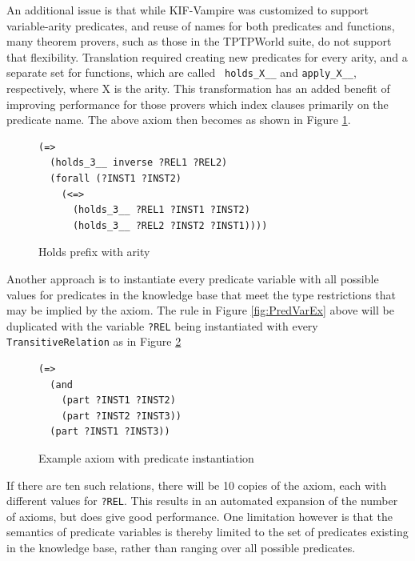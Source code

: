\documentclass{book}
\begin{document}
An additional issue is that while KIF-Vampire was customized to support
variable-arity predicates, and reuse of names for both predicates and functions,
many theorem provers, such as those in the TPTPWorld suite, do not support that
flexibility.  Translation required creating new predicates for every
arity, and a separate set for functions, which are called {\tt
holds\_X\_\_} and {\tt apply\_X\_\_}, respectively, where X is the arity.  This
transformation has an added benefit of improving performance for those provers
which index clauses primarily on the predicate name.  The above axiom then
becomes as shown in Figure \ref{fig:HoldsArity}.

\begin{figure}
\begin{framed}
\label{fig:HoldsArity}
\begin{verbatim}
(=>
  (holds_3__ inverse ?REL1 ?REL2)
  (forall (?INST1 ?INST2)
    (<=>
      (holds_3__ ?REL1 ?INST1 ?INST2)
      (holds_3__ ?REL2 ?INST2 ?INST1))))
\end{verbatim}
\caption{Holds prefix with arity}
\end{framed}
\end{figure}

Another approach is to instantiate every predicate variable with all possible
values for predicates in the knowledge base that meet the type restrictions that
may be implied by the axiom.  The rule in Figure \ref{fig:PredVarEx} above will
be duplicated with the variable {\tt ?REL} being instantiated with every {\tt
TransitiveRelation} as in Figure \ref{fig:ExAxPred}
 
\begin{figure}
\begin{framed}
\label{fig:ExAxPred}
\begin{verbatim}
(=>
  (and
    (part ?INST1 ?INST2)
    (part ?INST2 ?INST3))
  (part ?INST1 ?INST3))
\end{verbatim}
\caption{Example axiom with predicate instantiation}
\end{framed}
\end{figure}

If there are ten such relations, there will be 10 copies of the axiom, each with
different values for {\tt ?REL}. This results in an automated expansion of the
number of axioms, but does give good performance.  One limitation however is
that the semantics of predicate variables is thereby
limited to the set of predicates existing in the knowledge base, rather than
ranging over all possible predicates.
\end{document}
